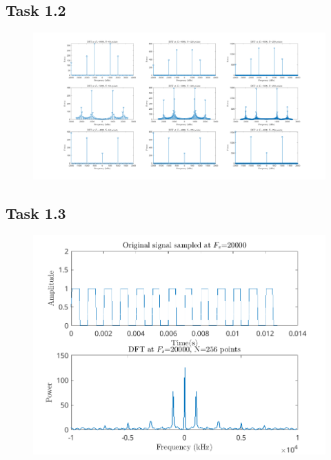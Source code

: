 \documentclass{article}
\begin{document}
\subsection{Task 1.2}
\begin{figure}[!ht]
    \includegraphics[width=\textwidth]{Ass1b.png}
\end{figure}
\subsection{Task 1.3}
\begin{figure}[!ht]
    \includegraphics[width=\textwidth]{Ass1c.png}
\end{figure}
\end{document}
